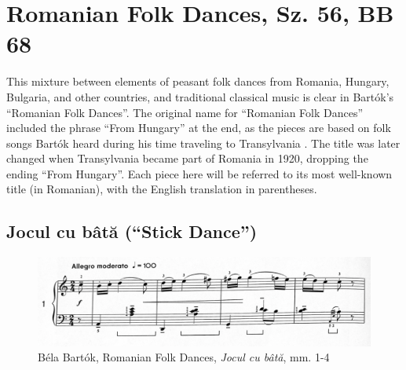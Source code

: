 \section{Romanian Folk Dances, Sz. 56, BB 68}

This mixture between elements of peasant folk dances from Romania, Hungary, Bulgaria, and other countries, and traditional classical music is clear in Bartók's ``Romanian Folk Dances''. The original name for ``Romanian Folk Dances'' included the phrase ``From Hungary'' at the end, as the pieces are based on folk songs Bartók heard during his time traveling to Transylvania \autocite{Burkholder_Grout_Palisca_2014}. The title was later changed when Transylvania became part of Romania in 1920, dropping the ending ``From Hungary''. Each piece here will be referred to its most well-known title (in Romanian), with the English translation in parentheses.

\subsection{Jocul cu bâtă (``Stick Dance'')}

\begin{figure}
  \centering
  \includegraphics[width=\textwidth]{figures/bartok-stick-dance-first-line.jpg}
  \caption{Béla Bartók, Romanian Folk Dances, \textit{Jocul cu bâtă}, mm. 1-4}
  \label{fig:Bartók-stick-dance-first-line}
\end{figure}

